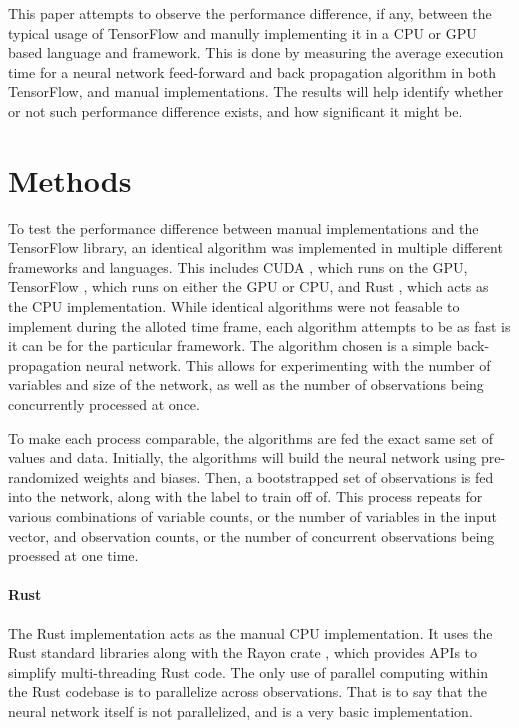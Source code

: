 \documentclass[12pt]{article}
\begin{document}
This paper attempts to observe the performance difference, if any, between the typical usage of TensorFlow and manully implementing it in a CPU or GPU based language and framework.
This is done by measuring the average execution time for a neural network feed-forward and back propagation algorithm in both TensorFlow, and manual implementations.
The results will help identify whether or not such performance difference exists, and how significant it might be.




\section{Methods}

To test the performance difference between manual implementations and the TensorFlow library, an identical algorithm was implemented in multiple different frameworks and languages.
This includes CUDA \cite{lib_cuda}, which runs on the GPU, TensorFlow \cite{lib_tensorflow}, which runs on either the GPU or CPU, and Rust \cite{lang_rust}, which acts as the CPU implementation.
While identical algorithms were not feasable to implement during the alloted time frame, each algorithm attempts to be as fast is it can be for the particular framework.
The algorithm chosen is a simple back-propagation neural network.
This allows for experimenting with the number of variables and size of the network, as well as the number of observations being concurrently processed at once.

To make each process comparable, the algorithms are fed the exact same set of values and data.
Initially, the algorithms will build the neural network using pre-randomized weights and biases.
Then, a bootstrapped set of observations is fed into the network, along with the label to train off of.
This process repeats for various combinations of variable counts, or the number of variables in the input vector, and observation counts, or the number of concurrent observations being proessed at one time.

\paragraph{Rust}
The Rust implementation acts as the manual CPU implementation.
It uses the Rust \cite{lang_rust} standard libraries along with the Rayon crate \cite{lib_rayon}, which provides APIs to simplify multi-threading Rust code.
The only use of parallel computing within the Rust codebase is to parallelize across observations.
That is to say that the neural network itself is not parallelized, and is a very basic implementation.
\end{document}
